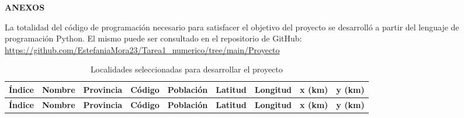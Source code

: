 
\begin{center}

{\fontsize{12pt}{14pt}\selectfont\textbf{ANEXOS}}

\end{center}

La totalidad del código de programación necesario para satisfacer el objetivo del proyecto se desarrolló a partir del lenguaje de programación Python. El mismo puede ser consultado en el repositorio de GitHub: \url{https://github.com/EstefaniaMora23/Tarea1_numerico/tree/main/Proyecto}

\begin{longtable}{|c|l|l|c|r|r|r|r|r|}
\caption{Localidades seleccionadas para desarrollar el proyecto}
\label{tab:localidades} \\

\hline
\textbf{Índice} & \textbf{Nombre} & \textbf{Provincia} & \textbf{Código} & \textbf{Población} & \textbf{Latitud} & \textbf{Longitud} & \textbf{x (km)} & \textbf{y (km)} \\ \hline
\endfirsthead

\hline
\textbf{Índice} & \textbf{Nombre} & \textbf{Provincia} & \textbf{Código} & \textbf{Población} & \textbf{Latitud} & \textbf{Longitud} & \textbf{x (km)} & \textbf{y (km)} \\ \hline
\endhead


\end{longtable}

